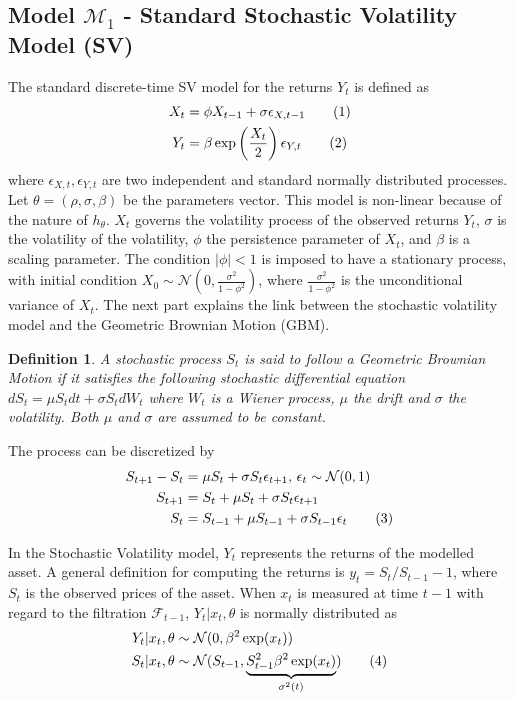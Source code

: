 \documentclass[11pt,a4,twosided,singlespacing,titlepagenumber=on]{scrreprt}
\numberwithin{equation}{chapter} %
\newtheorem{definition}[theorem]{Definition}%
\theoremstyle{remark}
\newcommand\numberthis{\addtocounter{equation}{1}\tag{\theequation}}
\begin{document}
\subsection{Model $\mathcal{M}_1$ - Standard Stochastic Volatility Model (SV)}
The standard discrete-time SV model for the returns $Y_t$ is defined as
\begin{align*}
  X_t &=  \phi X_{t-1} + \sigma \epsilon_{X,t-1} \numberthis \label{std_SV_process_X} \\
  Y_t &=  \beta \exp \left( \frac{X_t}{2} \right) \epsilon_{Y,t} \numberthis
\end{align*}
where $\epsilon_{X,t}, \epsilon_{Y,t}$ are two independent and standard normally distributed processes. Let $\theta = (\rho, \sigma, \beta)$ be the parameters vector. This model is non-linear because of the nature of $h_\theta$. $X_t$ governs the volatility process of the observed returns $Y_t$, $\sigma$ is the volatility of the volatility, $\phi$ the persistence parameter of $X_t$, and $\beta$ is a scaling parameter. The condition $|\phi| < 1$  is imposed to have a stationary process, with initial condition $X_0 \sim \mathcal{N} \left(0, \frac{\sigma^2}{1-\phi^2} \right)$, where $\frac{\sigma^2}{1-\phi^2}$ is the unconditional variance of $X_t$. The next part explains the link between the stochastic volatility model and the Geometric Brownian Motion (GBM).

\begin{definition}
\textit{
A stochastic process $S_t$ is said to follow a Geometric Brownian Motion if it satisfies the following stochastic differential equation
$dS_t = \mu S_t dt + \sigma S_t dW_t$
where $W_t$ is a Wiener process, $\mu$ the drift and $\sigma$ the volatility. Both $\mu$ and $\sigma$ are assumed to be constant.}
\end{definition}

The process can be discretized by
\begin{align*}
S_{t+1}-S_t &= \mu S_t + \sigma S_t \epsilon_{t+1} \text{, } \epsilon_{t} \sim \mathcal{N}(0,1) \\
S_{t+1} 	&= S_t + \mu S_t + \sigma S_t \epsilon_{t+1} \\
S_t 	&= S_{t-1} + \mu S_{t-1} + \sigma S_{t-1} \epsilon_t \numberthis
\end{align*}

In the Stochastic Volatility model, $Y_t$ represents the returns of the modelled asset. A general definition for computing the returns is $y_t = S_t / S_{t-1} - 1$, where $S_t$ is the observed prices of the asset. When $x_t$ is measured at time $t-1$ with regard to the filtration $\mathcal{F}_{t-1}$, $Y_t | x_t, \theta$ is normally distributed as
\begin{align*}
Y_t | x_t, \theta 					&\sim \mathcal{N}(0, \beta^2 \exp(x_t)) \\
S_t | x_t, \theta 					&\sim \mathcal{N}(S_{t-1}, \underbrace{S_{t-1}^2 \beta^2 \exp(x_t)}_{\sigma^2(t)}) \numberthis \label{cond_dist_sv_model}
\end{align*}
\end{document}
